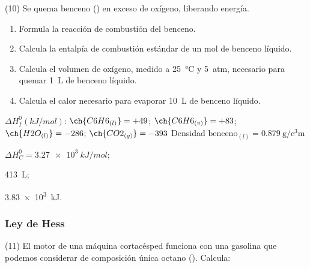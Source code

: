 \documentclass[10pt]{article}
\newenvironment{gexdatos}{
      \noindent\makebox[0pt][r]{\textit{Datos:}}
    }{\vspace{5pt}}
\begin{document}
\begin{multicols}{2}
\begin{exercise}[
    tags    = {},
    topics  = {química, termodinámica, termoquímica},
    source  = {FQ 1B MGH 2016, p179, e10},
  ]
  (10) Se quema benceno () en exceso de oxígeno, liberando energía.

  \begin{enumerate}
    \item Formula la reacción de combustión del benceno.
    \item Calcula la entalpía de combustión estándar de un mol de
    benceno líquido.
    \item Calcula el volumen de oxígeno, medido a \SI{25}{\celsius} y \SI{5}{atm}, necesario para quemar \SI{1}{\liter} de benceno líquido.
    \item Calcula el calor necesario para evaporar \SI{10}{\liter} de benceno líquido.
  \end{enumerate}

  \begin{gexdatos}
    \( \Delta H^0_f (\si{kJ/mol}) \):
    \( \ch{C6H6_{(l)}}  = +49 \);
    \( \ch{C6H6_{(v)}}  = +83 \);
    \( \ch{H2O_{(l)}}   = -286 \);
    \( \ch{CO2_{(g)}}   = -393 \)
    Densidad \( \textrm{benceno}_{(l)} = \SI{0.879}{\gram\per\cubic\centi\meter} \)
  \end{gexdatos}
\end{exercise}

\begin{solution}
  \begin{enumerate*}
    \item \( \Delta H^0_C = \SI{3.27e3}{kJ/mol} \); \item \SI{413}{\liter}; \item \SI{3.83e3}{kJ}.
  \end{enumerate*}
\end{solution}





\subsubsection{Ley de Hess}

\begin{exercise}[
    tags    = {},
    topics  = {química, termodinámica, termoquímica},
    source  = {FQ 1B MGH 2016, p180, e11},
  ]
  (11) El motor de una máquina cortacésped funciona con una gasolina que podemos considerar de composición única octano (). Calcula:


\end{exercise}
\end{multicols}
\end{document}

